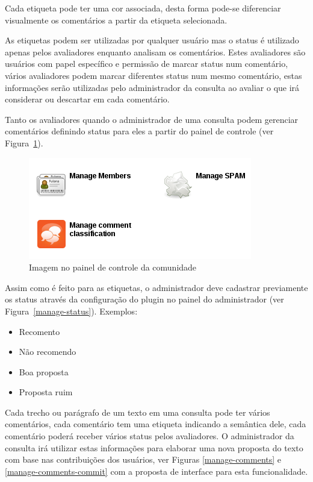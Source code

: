 \documentclass[12pt]{article}
\begin{document}
Cada etiqueta pode ter uma cor associada, desta forma pode-se diferenciar
visualmente os comentários a partir da etiqueta selecionada.

As etiquetas podem ser utilizadas por qualquer usuário mas o status é
utilizado apenas pelos avaliadores enquanto analisam os comentários. Estes
avaliadores são usuários com papel específico e permissão de marcar status
num comentário, vários avaliadores podem marcar diferentes status num
mesmo comentário, estas informações serão utilizadas pelo administrador da consulta
ao avaliar o que irá considerar ou descartar em cada comentário.

Tanto os avaliadores quando o administrador de uma consulta podem gerenciar
comentários definindo status para eles a partir do painel de controle (ver
Figura~\ref{control-panel}).

\begin{figure}[h!]
\center
\includegraphics[scale=0.5]{control-panel.png}
\caption{Imagem no painel de controle da comunidade}
\label{control-panel}
\end{figure}

Assim como é feito para as etiquetas, o administrador deve cadastrar
previamente os status através da configuração do plugin no painel do
administrador (ver Figura~\ref{manage-status}). Exemplos:

\begin{itemize}
  \item Recomento
  \item Não recomendo
  \item Boa proposta
  \item Proposta ruim
\end{itemize}

Cada trecho ou parágrafo de um texto em uma consulta pode ter vários
comentários, cada comentário tem uma etiqueta indicando a semântica dele, cada
comentário poderá receber vários status pelos avaliadores. O
administrador da consulta irá utilizar estas informações para elaborar uma
nova proposta do texto com base nas contribuições dos usuários, ver Figuras
\ref{manage-comments} e \ref{manage-comments-commit} com a proposta de interface
para esta funcionalidade.
\end{document}
